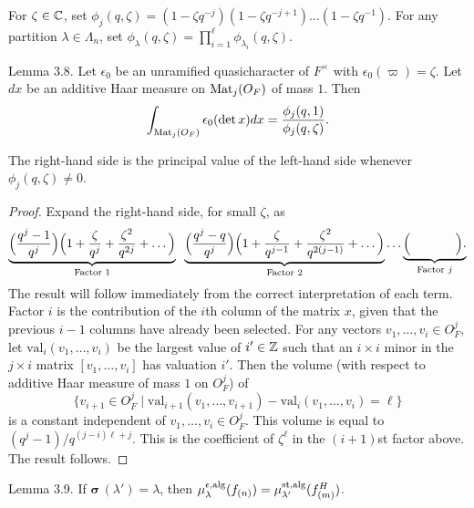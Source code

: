 \documentclass{amsart}
\begin{document}
For 
  $ \zeta \in \Bbb C $,
set
  $ \phi_j (q,\zeta) =
    ( 1 - \zeta q^{-j})
    ( 1 - \zeta q^{-j+1}) \dots
    ( 1 -  {\zeta}q^{-1}) $.
For any partition
  $ \lambda \in \Lambda_n $,
set
  $ \phi_{\lambda} (q, \zeta) = 
    \prod_{i=1}^{\ell} \phi_{\lambda_i}
    (q, \zeta) $.

\proclaim Lemma {3.8}.
Let
  $ \epsilon_0 $
be an unramified quasicharacter of $F^\times$ with
  $ \epsilon_0 (\varpi) = \zeta $.  Let
  $ d x $ be
an additive Haar measure on 
  $ \text{{\rm Mat}}_j (O_F) $
of mass $1$.
Then
%
$$
  \int_{ \text{{\rm Mat}}_j (O_F)}
  \epsilon_0 (\det x) d x =
  \frac
     {\phi_j (q, 1)}
     {\phi_j (q, \zeta)}.
$$
%
\finishproclaim

\noindent
The right-hand side is the principal value of the
  left-hand side  whenever
  $ \phi_j (q,\zeta) \neq 0 $.

\begin{proof}
Expand the right-hand side, for small
  $ \zeta  $, as
%
$$
    \underbrace{\Bigl(
       \frac {q^j -1}{q^j}
    \Bigr)
    \Bigl(
      1 +
      \frac {\zeta}{q^j} +
      \frac {\zeta^2}{q^{2j}} + \dots
    \Bigr)
  }_{\text{Factor $1$}} \;\;
  \underbrace %
    {\Bigl(
       \frac {q^j -q}{q^j}
    \Bigr)
    \Bigl(
      1 +
      \frac {\zeta}{q^{j-1}} +
      \frac {\zeta^2}{q^{2(j-1)}} + \dots
    \Bigr)
  }_{\text{Factor $2$}}
\dots
    \underbrace %
       {\Bigl( 
          \hskip .5in
       \Bigr).
    }_{\text{Factor $j$}}
$$
%
The result will follow immediately from the correct interpretation
of each term.
Factor $i$ is the contribution of the $i$th column of the matrix
  $x$, given that the previous
  $ i - 1 $ 
columns have already been selected.
For any vectors
  $ v_1, \dots , v_i \in O_F^j $,
let
  $ \text{val}_i (v_1, \dots , v_i) $
be the largest value of 
  $ i' \in {\Bbb Z} $
such that an 
  $ i \times i $
minor in the 
  $ j \times i $ 
matrix
  $ [v_1, \dots , v_i ] $
has valuation $i'$.  
Then the volume (with respect to additive Haar measure
  of mass  $1$ on
  $ O_F^j $) of
%
  $$\{ v_{i+1} \in O_F^j \mid
   \text{val}_{i+1} (v_1 , \dots, v_{i+1}) -
    \text{val}_i (v_1 , \dots, v_i) = \ell\}$$
is a constant independent of 
  $ v_1, \dots , v_i \in O_F^j $.
This volume is equal to
  $ (q^j-1)/q^{(j-i)\ell + j}$.
This is the coefficient of 
  $ \zeta^{\ell} $
in the 
  $ (i+1)$st factor above.
The result follows.
\end{proof}
 
\proclaim Lemma {3.9}.
If
   $\pmb\sigma \, (\lambda') = \lambda $,
then
  $ \mu_{\lambda}^{\epsilon, \text{{\rm alg}} }
      (f_{(n)}) =
    \mu_{\lambda'}^{\text{{\rm st,alg}}}
      (f^H_{(m)})$.
\finishproclaim
\end{document}
